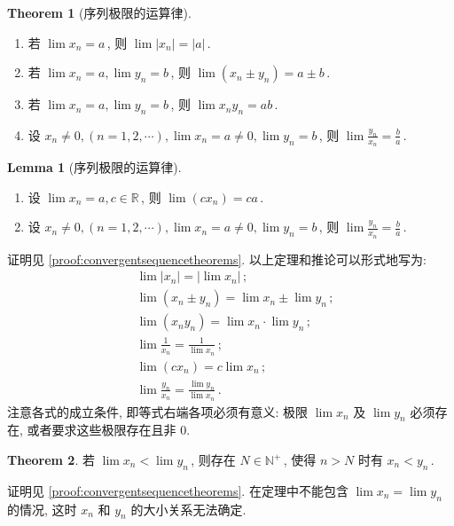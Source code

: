 \documentclass{book}
\newcommand{\abs}[1]{\left\lvert #1 \right\rvert}
\newcommand{\R}{\mathbb{R}}
\newcommand{\N}{\mathbb{N}}
\numberwithin{equation}{section}
\numberwithin{figure}{section}
\theoremstyle{definition}
\newtheorem{theorem}{Theorem}[section]
\newtheorem{lemma}{Lemma}[section]
\begin{document}
\begin{theorem}[序列极限的运算律]
  \leavevmode

  \begin{enumerate}
    \item 若 $\lim x_n=a$\,, 则 $\lim\abs{x_n}=\abs{a}$\,.
    \item 若 $\lim x_n=a,\lim y_n=b$\,, 则 $\lim(x_n\pm y_n)=a\pm b$\,.
    \item 若 $\lim x_n=a,\lim y_n=b$\,, 则 $\lim x_n y_n=ab$\,.
    \item 设 $x_n\neq0,(n=1,2,\cdots),\lim x_n=a\neq0,\lim y_n=b$\,, 则 $\displaystyle\lim \frac{y_n}{x_n}=\frac{b}{a}$\,.
  \end{enumerate}
  \label{the:LimitOperationAttributes}
\end{theorem}
\begin{lemma}[序列极限的运算律]
  \leavevmode

  \begin{enumerate}[start=5]
    \item 设 $\lim x_n=a,c\in\R$\,, 则 $\lim(cx_n)=ca$\,.
    \item 设 $x_n\neq0,(n=1,2,\cdots),\lim x_n=a\neq0,\lim y_n=b$\,, 则 $\displaystyle\lim \frac{y_n}{x_n}=\frac{b}{a}$\,.
  \end{enumerate}
  \label{lem:LimitOperationAttributes}
\end{lemma}
证明见 \cref{proof:convergentsequencetheorems}.
以上定理和推论可以形式地写为:
\begin{align*}
  &\lim\abs{x_n}=\abs{\lim x_n}\,;\\
  &\lim (x_n\pm y_n)=\lim x_n\pm \lim y_n\,;\\
  &\lim(x_n y_n)=\lim x_n\cdot \lim y_n\,;\\
  &\lim\frac{1}{x_n}=\frac{1}{\lim x_n}\,;\\
  &\lim (cx_n)=c\lim x_n\,;\\
  &\lim \frac{y_n}{x_n}=\frac{\lim y_n}{\lim x_n}\,.
\end{align*}
注意各式的成立条件, 即等式右端各项必须有意义: 极限 $\lim x_n$ 及 $\lim y_n$ 必须存在, 或者要求这些极限存在且非 0.

\begin{theorem}
  若 $\lim x_n<\lim y_n$\,, 则存在 $N\in\N^+$\,, 使得 $n>N$ 时有 $x_n<y_n$\,.
  \label{the:fromLimitToInequal}
\end{theorem}
证明见 \cref{proof:convergentsequencetheorems}. 在定理中不能包含 $\lim x_n=\lim y_n$ 的情况, 这时 $x_n$ 和 $y_n$ 的大小关系无法确定.
\end{document}
